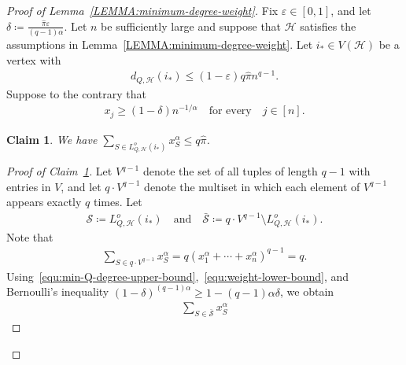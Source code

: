 \documentclass[11pt,a4paper]{article}
\newtheorem{claim}[definition]{Claim}
\begin{document}
\begin{proof}[Proof of Lemma~\ref{LEMMA:minimum-degree-weight}]
    Fix $\varepsilon \in [0, 1]$, and let $\delta \coloneqq \frac{\hat{\pi} \varepsilon}{(q-1)\alpha}$.
    Let $n$ be sufficiently large and suppose that $\mathcal{H}$ satisfies the assumptions in Lemma~\ref{LEMMA:minimum-degree-weight}. 
    Let $i_{\ast} \in V(\mathcal{H})$ be a vertex with 
    \begin{align}\label{equ:min-Q-degree-upper-bound}
        d_{Q,\mathcal{H}}(i_{\ast}) 
        \le (1-\varepsilon) q \hat{\pi} n^{q-1}. 
    \end{align}
    Suppose to the contrary that 
    \begin{align}\label{equ:weight-lower-bound}
        x_{j} 
        \ge (1-\delta) n^{-1/\alpha}
        \quad\text{for every}\quad j \in [n]. 
    \end{align}
    \begin{claim}\label{CLAIM:Lemma-link-sum-upper-bound}
        We have $\sum_{S \in L_{Q,\mathcal{H}}^{o}(i_{\ast})} x_{S}^{\alpha} \le q  \hat{\pi}$.
    \end{claim}
    \begin{proof}[Proof of Claim~\ref{CLAIM:Lemma-link-sum-upper-bound}]
        Let $V^{q-1}$ denote the set of all tuples of length $q-1$ with entries in $V$, and let $q\cdot V^{q-1}$ denote the multiset in which each element of $V^{q-1}$ appears exactly $q$ times. 
        Let 
        \begin{align*}
            \mathcal{S} \coloneqq L_{Q,\mathcal{H}}^{o}(i_{\ast})
            \quad\text{and}\quad 
            \bar{\mathcal{S}} \coloneqq q\cdot V^{q-1} \setminus L_{Q,\mathcal{H}}^{o}(i_{\ast}). 
        \end{align*}
        Note that 
        \begin{align}\label{equ:sum-q}
            \sum_{S \in q \cdot V^{q-1}} x_{S}^{\alpha}
            = q\left(x_{1}^{\alpha} + \cdots + x_{n}^{\alpha}\right)^{q-1} 
            = q. 
        \end{align}
        Using~\eqref{equ:min-Q-degree-upper-bound},~\eqref{equ:weight-lower-bound}, and Bernoulli's inequality $(1-\delta)^{(q-1)\alpha} \ge 1- (q-1)\alpha \delta$, we obtain 
        \begin{align*}
            \sum_{S \in \bar{\mathcal{S}}} x_{S}^{\alpha} 

\end{align*}
\end{proof}
\end{proof}
\end{document}
